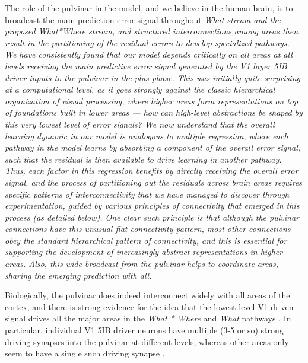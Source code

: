\documentclass[11pt,twoside]{article}
\newif\myifpdf
\begin{document}
 The role of the pulvinar in the model, and we believe in the human brain, is to broadcast the main prediction error signal throughout \em{What} stream and the proposed \em{What*Where} stream, and structured interconnections among areas then result in the partitioning of the residual errors to develop specialized pathways. We have consistently found that our model depends critically on all areas at all levels receiving the main predictive error signal generated by the V1 layer 5IB driver inputs to the pulvinar in the plus phase.  This was initially quite surprising at a computational level, as it goes strongly against the classic hierarchical organization of visual processing, where higher areas form representations on top of foundations built in lower areas --- how can high-level abstractions be shaped by this very lowest level of error signals?  We now understand that the overall learning dynamic in our model is analogous to \emph{multiple regression}, where each pathway in the model learns by  absorbing a component of the overall error signal, such that the residual is then available to drive learning in another pathway.  Thus, each factor in this regression benefits by directly receiving the overall error signal, and the process of partitioning out the residuals across brain areas requires specific patterns of interconnectivity that we have managed to discover through experimentation, guided by various principles of connectivity that emerged in this process (as detailed below).  One clear such principle is that although the pulvinar connections have this unusual flat connectivity pattern, most other connections obey the standard hierarchical pattern of connectivity, and this is essential for supporting the development of increasingly abstract representations in higher areas.  Also, this wide broadcast from the pulvinar helps to coordinate areas, sharing the emerging prediction with all.

Biologically, the pulvinar does indeed interconnect widely with all areas of the cortex, and there is strong evidence for the idea that the lowest-level V1-driven signal drives all the major areas in the {\em What * Where} and {\em What} pathways \cite{Shipp03,KaasLyon07}.  In particular, individual V1 5IB driver neurons have multiple (3-5 or so) strong driving synapses into the pulvinar at different levels, whereas other areas only seem to have a single such driving synapse \cite{Rockland98a,Rockland96}.  
\end{document}
